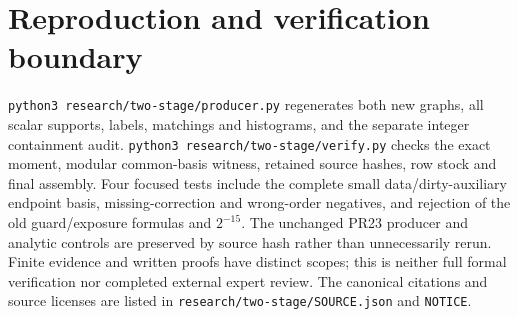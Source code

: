 \documentclass[11pt]{article}
\begin{document}
\section{Reproduction and verification boundary}
\texttt{python3 research/two-stage/producer.py} regenerates both new graphs,
all scalar supports, labels, matchings and histograms, and the separate
integer containment audit. \texttt{python3 research/two-stage/verify.py}
checks the exact moment, modular common-basis witness, retained source hashes,
row stock and final assembly. Four focused tests include the complete small
data/dirty-auxiliary endpoint basis, missing-correction and wrong-order
negatives, and rejection of the old guard/exposure formulas and $2^{-15}$.
The unchanged PR23 producer and analytic controls are preserved by source
hash rather than unnecessarily rerun. Finite evidence and written proofs
have distinct scopes; this is neither full formal verification nor completed
external expert review. The canonical citations and source licenses are
listed in \texttt{research/two-stage/SOURCE.json} and \texttt{NOTICE}.
\end{document}
